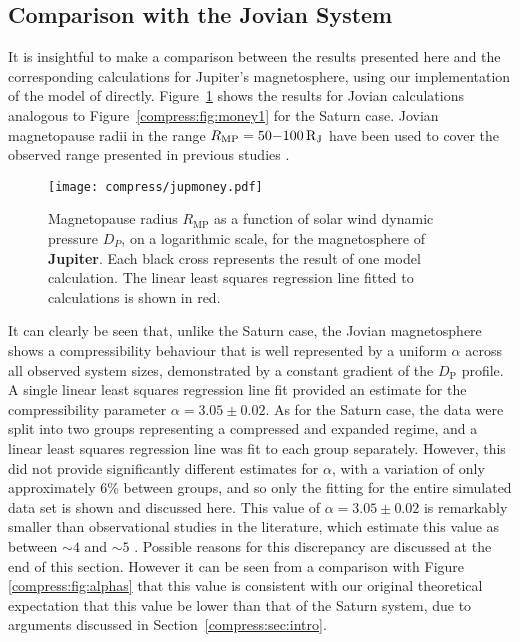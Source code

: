 \subsection{Comparison with the Jovian System}\label{compress:sec:jup}
It is insightful to make a comparison between the results presented here and the corresponding calculations for Jupiter's magnetosphere, using our implementation of the model of \citet{caudal1986} directly. Figure~\ref{compress:fig:jupmoney} shows the results for Jovian calculations analogous to Figure~\ref{compress:fig:money1} for the Saturn case. Jovian magnetopause radii in the range $R_\mathrm{MP} = 50{\--}\SI{100}{R_J}$ have been used to cover the observed range presented in previous studies \citep{joy2002}.
\begin{figure}
\centering
\noindent\texttt{[image: compress/jupmoney.pdf]}
\caption[Magnetopause radius versus solar wind dynamic pressure profile for Jupiter's magnetosphere.]{Magnetopause radius $R_\mathrm{MP}$ as a function of solar wind dynamic pressure $D_{P}$, on a logarithmic scale, for the magnetosphere of \textbf{Jupiter}. Each black cross represents the result of one model calculation. The linear least squares regression line fitted to calculations is shown in red.}
\label{compress:fig:jupmoney}
\end{figure}

It can clearly be seen that, unlike the Saturn case, the Jovian magnetosphere shows a compressibility behaviour that is well represented by a uniform $\alpha$ across all observed system sizes, demonstrated by a constant gradient of the $D_\mathrm{P}$ profile. A single linear least squares regression line fit provided an estimate for the compressibility parameter $\alpha=3.05 \pm 0.02$. As for the Saturn case, the data were split into two groups representing a compressed and expanded regime, and a linear least squares regression line was fit to each group separately. However, this did not provide significantly different estimates for $\alpha$, with a variation of only approximately 6$\%$ between groups, and so only the fitting for the entire simulated data set is shown and discussed here. This value of $\alpha=3.05 \pm 0.02$ is remarkably smaller than observational studies in the literature, which estimate this value as between ${\sim}4$ and ${\sim}5$ \citep{huddleston1998,joy2002,alexeev2005}. Possible reasons for this discrepancy are discussed at the end of this section. However it can be seen from a comparison with Figure \ref{compress:fig:alphas} that this value is consistent with our original theoretical expectation that this value be lower than that of the Saturn system, due to arguments discussed in Section~\ref{compress:sec:intro}.


